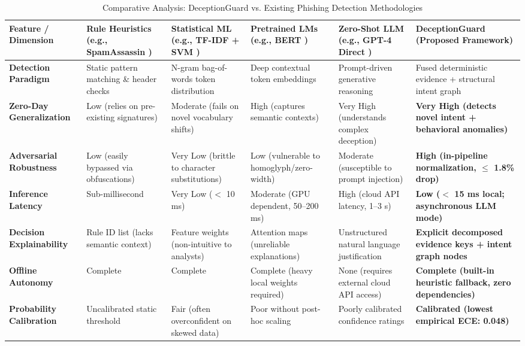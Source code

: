 \documentclass{ieeeaccess}
\begin{document}
\begin{table}[!t]
\caption{Comparative Analysis: DeceptionGuard vs. Existing Phishing Detection Methodologies}
\label{tab:comparison}
\centering
\setlength{\tabcolsep}{4.5pt}
\begin{tabular}{|p{85pt}|p{65pt}|p{65pt}|p{70pt}|p{75pt}|p{85pt}|}
\hline
\textbf{Feature / Dimension} & \textbf{Rule Heuristics (e.g., SpamAssassin \cite{b4})} & \textbf{Statistical ML (e.g., TF-IDF + SVM \cite{b2})} & \textbf{Pretrained LMs (e.g., BERT \cite{b7})} & \textbf{Zero-Shot LLM (e.g., GPT-4 Direct \cite{b10})} & \textbf{DeceptionGuard (Proposed Framework)} \\
\hline
\textbf{Detection Paradigm} & Static pattern matching \& header checks & N-gram bag-of-words token distribution & Deep contextual token embeddings & Prompt-driven generative reasoning & Fused deterministic evidence + structural intent graph \\
\hline
\textbf{Zero-Day Generalization} & Low (relies on pre-existing signatures) & Moderate (fails on novel vocabulary shifts) & High (captures semantic contexts) & Very High (understands complex deception) & \textbf{Very High (detects novel intent + behavioral anomalies)} \\
\hline
\textbf{Adversarial Robustness} & Low (easily bypassed via obfuscations) & Very Low (brittle to character substitutions) & Low (vulnerable to homoglyph/zero-width) & Moderate (susceptible to prompt injection) & \textbf{High (in-pipeline normalization, $\le$ 1.8\% drop)} \\
\hline
\textbf{Inference Latency} & Sub-millisecond & Very Low ($<$ 10 ms) & Moderate (GPU dependent, 50--200 ms) & High (cloud API latency, 1--3 s) & \textbf{Low ($<$ 15 ms local; asynchronous LLM mode)} \\
\hline
\textbf{Decision Explainability} & Rule ID list (lacks semantic context) & Feature weights (non-intuitive to analysts) & Attention maps (unreliable explanations) & Unstructured natural language justification & \textbf{Explicit decomposed evidence keys + intent graph nodes} \\
\hline
\textbf{Offline Autonomy} & Complete & Complete & Complete (heavy local weights required) & None (requires external cloud API access) & \textbf{Complete (built-in heuristic fallback, zero dependencies)} \\
\hline
\textbf{Probability Calibration} & Uncalibrated static threshold & Fair (often overconfident on skewed data) & Poor without post-hoc scaling & Poorly calibrated confidence ratings & \textbf{Calibrated (lowest empirical ECE: 0.048)} \\
\hline
\end{tabular}
\end{table}
\end{document}
